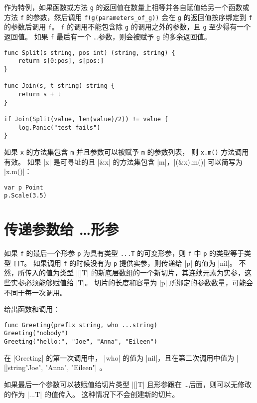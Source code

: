 作为特例，如果函数或方法 \lstinline|g| 的返回值在数量上相等并各自赋值给另一个函数或方法 \lstinline|f| 的参数，然后调用 \lstinline|f(g(parameters_of_g))| 会在 \lstinline|g| 的返回值按序绑定到 \lstinline|f| 的参数后调用 \lstinline|f|。
\lstinline|f| 的调用不能包含除 \lstinline|g| 的调用之外的参数，且 \lstinline|g| 至少得有一个返回值。
如果 \lstinline|f| 最后有一个 \ldots 参数，则会被赋予 \lstinline|g| 的多余返回值。
\begin{lstlisting}[style=golang]
func Split(s string, pos int) (string, string) {
	return s[0:pos], s[pos:]
}

func Join(s, t string) string {
	return s + t
}

if Join(Split(value, len(value)/2)) != value {
	log.Panic("test fails")
}
\end{lstlisting}
如果 \lstinline|x| 的方法集包含 \lstinline|m| 并且参数可以被赋予 \lstinline|m| 的参数列表， 则 \lstinline|x.m()| 方法调用有效。
如果 \code|x| 是可寻址的且 \code|&x| 的方法集包含 \code|m|，\code|(&x).m()| 可以简写为 \code|x.m()|：
\begin{lstlisting}[style=golang]
var p Point
p.Scale(3.5)
\end{lstlisting}

\section{传递参数给 \ldots 形参}
如果 \lstinline|f| 的最后一个形参 \lstinline|p| 为具有类型 \lstinline|...T| 的可变形参，则 \lstinline|f| 中 \lstinline|p| 的类型等于类型 \lstinline|[]T|。
如果调用 \lstinline|f| 的时候没有为 \lstinline|p| 提供实参，则传递给 \code|p| 的值为 \code|nil|。
不然，所传入的值为类型 \code|[]T| 的新底层数组的一个新切片，其连续元素为实参，这些实参必须能够赋值给 \code|T|。
切片的长度和容量为 \code|p| 所绑定的参数数量，可能会不同于每一次调用。

给出函数和调用：
\begin{lstlisting}[style=golang]
func Greeting(prefix string, who ...string)
Greeting("nobody")
Greeting("hello:", "Joe", "Anna", "Eileen")
\end{lstlisting}
在 \code|Greeting| 的第一次调用中， \code|who| 的值为 \code|nil|，且在第二次调用中值为 \code|[]string{"Joe", "Anna", "Eileen"}| 。

如果最后一个参数可以被赋值给切片类型 \code|[]T| 且形参跟在 \ldots 后面，则可以无修改的作为 \code|...T| 的值传入。
这种情况下不会创建新的切片。

